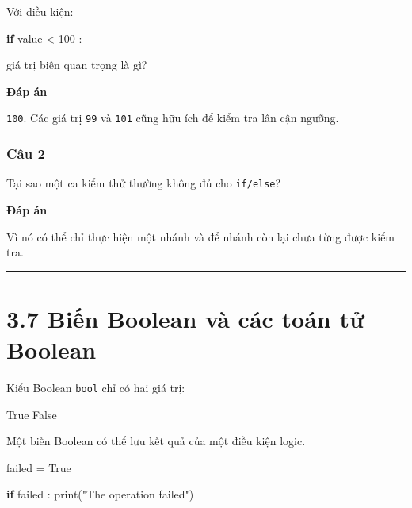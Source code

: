 \documentclass[
  11pt,
  a4paper,
]{article}
\newenvironment{Shaded}{}{}
\newcommand{\BuiltInTok}[1]{\textcolor[rgb]{0.00,0.50,0.00}{#1}}
\newcommand{\ControlFlowTok}[1]{\textcolor[rgb]{0.00,0.44,0.13}{\textbf{#1}}}
\newcommand{\DecValTok}[1]{\textcolor[rgb]{0.25,0.63,0.44}{#1}}
\newcommand{\NormalTok}[1]{#1}
\newcommand{\OperatorTok}[1]{\textcolor[rgb]{0.40,0.40,0.40}{#1}}
\newcommand{\StringTok}[1]{\textcolor[rgb]{0.25,0.44,0.63}{#1}}
\newcommand{\VariableTok}[1]{\textcolor[rgb]{0.10,0.09,0.49}{#1}}
\begin{document}
Với điều kiện:

\begin{Shaded}
\begin{Highlighting}[]
\ControlFlowTok{if}\NormalTok{ value }\OperatorTok{\textless{}} \DecValTok{100}\NormalTok{ :}
\end{Highlighting}
\end{Shaded}

giá trị biên quan trọng là gì?

\textbf{Đáp án}

\texttt{100}. Các giá trị \texttt{99} và \texttt{101} cũng hữu ích để
kiểm tra lân cận ngưỡng.

\subsubsection{Câu 2}\label{cuxe2u-2-5}

Tại sao một ca kiểm thử thường không đủ cho \texttt{if/else}?

\textbf{Đáp án}

Vì nó có thể chỉ thực hiện một nhánh và để nhánh còn lại chưa từng được
kiểm tra.

\begin{center}\rule{0.5\linewidth}{0.5pt}\end{center}

\section{3.7 Biến Boolean và các toán tử
Boolean}\label{biux1ebfn-boolean-vuxe0-cuxe1c-touxe1n-tux1eed-boolean}

Kiểu Boolean \texttt{bool} chỉ có hai giá trị:

\begin{Shaded}
\begin{Highlighting}[]
\VariableTok{True}
\VariableTok{False}
\end{Highlighting}
\end{Shaded}

Một biến Boolean có thể lưu kết quả của một điều kiện logic.

\begin{Shaded}
\begin{Highlighting}[]
\NormalTok{failed }\OperatorTok{=} \VariableTok{True}

\ControlFlowTok{if}\NormalTok{ failed :}
    \BuiltInTok{print}\NormalTok{(}\StringTok{"The operation failed"}\NormalTok{)}
\end{Highlighting}
\end{Shaded}
\end{document}
